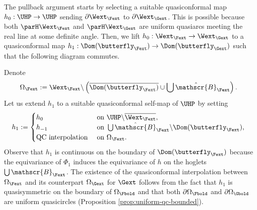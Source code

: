 \documentclass{amsart}
\begin{document}
The pullback argument starts by selecting a suitable quasiconformal map $h_0 : \UHP \to \UHP$ sending $\partial \Wext_{\Fext}$ to $\partial \Wext_{\Gext}$.
This is possible because both $\parH \Wext_{\Fext}$ and $\parH \Wext_{\Gext}$ are uniform quasiarcs meeting the real line at some definite angle.
Then, we lift $h_0: \Wext_{\Fext} \to \Wext_{\Gext}$ to a quasiconformal map $h_1: \Dom(\butterfly_{\Fext}) \to \Dom(\butterfly_{\Gext})$ such that the following diagram commutes.
\begin{center}
\end{center}
Denote
\[
    \Omega_{\Fext} := \Wext_{\Fext} \backslash 
    \left( \overline{\Dom(\butterfly_{\Fext})} \cup \bigcup \hat{\mathscr{B}}_{\Fext} \right).
\]
Let us extend $h_1$ to a suitable quasiconformal self-map of $\UHP$ by setting
\[
    h_1 := \begin{cases}
        h_0 & \text{ on } \UHP \backslash \overline{\Wext_{\Fext}}, \\
        h_{-1} & \text{ on } \bigcup \hat{\mathscr{B}}_{\Fext} \backslash 
        \Dom(\butterfly_{\Fext}), \\
        \textnormal{QC interpolation} & \text{ on } \Omega_{\Fext}.
    \end{cases}
\]
Observe that $h_1$ is continuous on the boundary of $\Dom(\butterfly_{\Fext})$ because the equivariance of $\Phi_1$ induces the equivariance of $h$ on the hoglets $\bigcup \mathscr{B}_{\Fext}$. 
The existence of the quasiconformal interpolation between $\Omega_{\Fext}$ and its counterpart $\Omega_{\Gext}$ for $\Gext$ follows from the fact that $h_1$ is quasisymmetric on the boundary of $\Omega_\Fbold$ and that both $\partial \Omega_\Fbold$ and $\partial \Omega_\Gbold$ are uniform quasicircles (Proposition \ref{prop:uniform-qc-bounded}).
\end{document}
